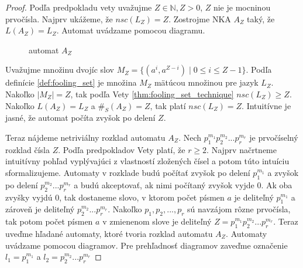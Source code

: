 \begin{proof}
Podľa predpokladu vety uvažujme $ Z \in \mathbb{N}, Z > 0 $, $ Z $ nie je mocninou prvočísla. Najprv ukážeme, že $ nsc(L_Z) = Z $. Zostrojme NKA $ A_Z $ taký, že $ L(A_Z)=L_Z $. Automat uvádzame pomocou diagramu.

\begin{figure}[H]
\centering
{}
\caption{automat $ A_Z $} \label{fig:Az}
\end{figure}

Uvažujme množinu dvojíc slov $ M_Z = \lbrace (a^{i},a^{Z-i}) \; | \; 0 \leq i \leq Z-1 \rbrace $. Podľa definície \ref{def:fooling_set} je množina $ M_Z $ mätúcou množinou pre jazyk $ L_Z $. Nakoľko $ |M_Z|=Z $, tak podľa Vety \ref{thm:fooling_set_technique} $ nsc(L_Z) \geq Z $. Nakoľko $ L(A_Z) = L_Z $ a $ \#_S(A_Z) = Z $, tak platí $ nsc(L_Z) = Z$. Intuitívne je jasné, že automat \glqq{}počíta zvyšok po delení $ Z $\grqq{}.
\par
Teraz nájdeme netriviálny rozklad automatu $ A_Z $. Nech $ p_{1}^{m_1}p_{2}^{m_2}...p_{r}^{m_r} $ je prvočíselný rozklad čísla $ Z $. Podľa predpokladov Vety platí, že $ r \geq 2 $. Najprv načrtneme intuitívny pohľad vyplývajúci z vlastností zložených čísel a potom túto intuíciu sformalizujeme. Automaty v rozklade budú počítať zvyšok po delení $ p_{1}^{m_1} $ a zvyšok po delení $p_{2}^{m_2}...p_{r}^{m_r} $ a budú akceptovať, ak nimi počítaný zvyšok vyjde 0. Ak oba zvyšky vyjdú 0, tak dostaneme slovo, v ktorom počet písmen $ a $ je deliteľný $ p_{1}^{m_1} $ a zároveň je deliteľný $p_{2}^{m_2}...p_{r}^{m_r} $. Nakoľko $ p_1, p_2,...,p_r $ sú navzájom rôzne prvočísla, tak potom počet písmen $ a $ v zmienenom slove je deliteľný $ Z=p_{1}^{m_1}p_{2}^{m_2}...p_{r}^{m_r} $. Teraz uveďme hľadané automaty, ktoré tvoria rozklad automatu $ A_Z $. Automaty uvádzame pomocou diagramov. Pre prehľadnosť diagramov zaveďme označenie $ l_1 = p_{1}^{m_1} $ a $ l_2 = p_{2}^{m_2}...p_{r}^{m_r} $


\end{proof}
